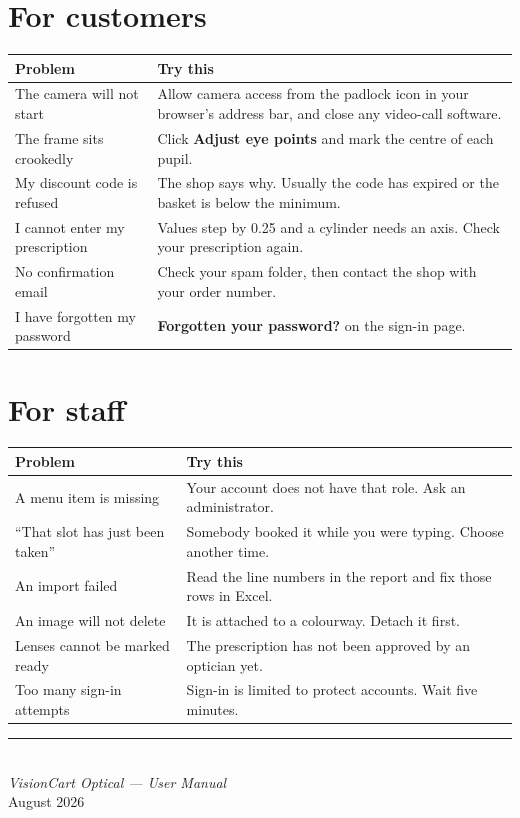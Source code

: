 \documentclass[11pt,a4paper]{report}
\newcommand{\btn}[1]{\textbf{#1}}
\begin{document}
\section*{For customers}

\begin{longtable}{@{}p{}p{}@{}}
\toprule
\textbf{Problem} & \textbf{Try this} \\
\midrule
\endhead
The camera will not start &
Allow camera access from the padlock icon in your browser's address bar,
and close any video-call software. \\[5pt]
The frame sits crookedly &
Click \btn{Adjust eye points} and mark the centre of each pupil. \\[5pt]
My discount code is refused &
The shop says why. Usually the code has expired or the basket is below
the minimum. \\[5pt]
I cannot enter my prescription &
Values step by 0.25 and a cylinder needs an axis. Check your
prescription again. \\[5pt]
No confirmation email &
Check your spam folder, then contact the shop with your order number. \\[5pt]
I have forgotten my password &
\btn{Forgotten your password?} on the sign-in page. \\
\bottomrule
\end{longtable}

\section*{For staff}

\begin{longtable}{@{}p{}p{}@{}}
\toprule
\textbf{Problem} & \textbf{Try this} \\
\midrule
\endhead
A menu item is missing &
Your account does not have that role. Ask an administrator. \\[5pt]
``That slot has just been taken'' &
Somebody booked it while you were typing. Choose another time. \\[5pt]
An import failed &
Read the line numbers in the report and fix those rows in Excel. \\[5pt]
An image will not delete &
It is attached to a colourway. Detach it first. \\[5pt]
Lenses cannot be marked ready &
The prescription has not been approved by an optician yet. \\[5pt]
Too many sign-in attempts &
Sign-in is limited to protect accounts. Wait five minutes. \\
\bottomrule
\end{longtable}

\vspace{1.4cm}
\begin{center}
\color{vcgrey}\small
\rule{0.35\textwidth}{0.4pt}\\[10pt]
\emph{VisionCart Optical --- User Manual}\\
August 2026
\end{center}
\end{document}
